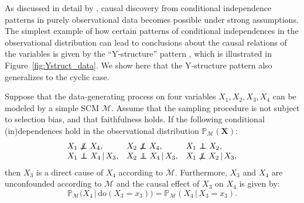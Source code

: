 \documentclass[twoside,11pt]{article}
\DeclareMathOperator*{\CI}{{\,\perp\mkern-12mu\perp\,}}
\DeclareMathOperator*{\nCI}{{\,\not\mkern-1mu\perp\mkern-12mu\perp\,}}
\newcommand{\Prb}{\mathbb{P}}
\newcommand\B[1]{\bm{#1}}
\newcommand\C[1]{\mathcal{#1}}
\newcommand\given{\,|\,}
\newcommand{\intervene}{\mathrm{do}}
\begin{document}
As discussed in detail by \citet{SGS2000},
causal discovery from conditional independence patterns in purely observational data becomes possible under strong assumptions. 
The simplest example of how certain patterns of conditional independences in the observational distribution can lead to conclusions
about the causal relations of the variables is given by the ``Y-structure'' pattern \citep{ManiPhD2006}, which is illustrated in 
Figure~\ref{fig:Ystruct_data}. We show here that the Y-structure pattern also generalizes to the cyclic case.
\begin{proposition}
  Suppose that the data-generating process on four variables $X_1,X_2,X_3,X_4$ can be modeled by a simple SCM $\C{M}$. Assume that the sampling procedure is not subject to selection bias, and that faithfulness holds. 
  If the following conditional (in)dependences hold in the observational distribution $\Prb_{\C{M}}(\B{X})$:
  $$\begin{array}{lll}
    X_1 \nCI X_4,  & X_2 \nCI X_4, & X_1 \CI X_2, \\
    X_1 \CI X_4 \given X_3, & X_2 \CI X_4 \given X_3, & X_1 \nCI X_2 \given X_3,
  \end{array}$$
  then $X_3$ is a direct cause of $X_4$ according to $\C{M}$. Furthermore, 
  $X_3$ and $X_4$ are unconfounded according to $\C{M}$ and
  the causal effect of $X_3$ on $X_4$ is given by:
  \begin{equation}\label{eq:Y_causal_effect}
    \Prb_{\C{M}}\big(X_4 \given \intervene(X_3=x_3)\big) = \Prb_{\C{M}}(X_4 \given X_3=x_3).
  \end{equation}
\end{proposition}
\end{document}
